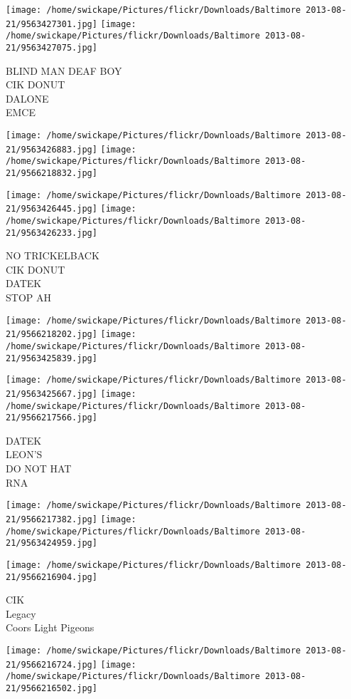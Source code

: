 \documentclass[10pt,letterpaper]{article}
\begin{document}
\texttt{[image: /home/swickape/Pictures/flickr/Downloads/Baltimore 2013-08-21/9563427301.jpg]}
\texttt{[image: /home/swickape/Pictures/flickr/Downloads/Baltimore 2013-08-21/9563427075.jpg]}

BLIND MAN DEAF BOY\\
CIK DONUT\\
DALONE\\
EMCE
\pagebreak

\texttt{[image: /home/swickape/Pictures/flickr/Downloads/Baltimore 2013-08-21/9563426883.jpg]}
\texttt{[image: /home/swickape/Pictures/flickr/Downloads/Baltimore 2013-08-21/9566218832.jpg]}

\texttt{[image: /home/swickape/Pictures/flickr/Downloads/Baltimore 2013-08-21/9563426445.jpg]}
\texttt{[image: /home/swickape/Pictures/flickr/Downloads/Baltimore 2013-08-21/9563426233.jpg]}

NO TRICKELBACK\\
CIK DONUT\\
DATEK\\
STOP AH
\pagebreak

\texttt{[image: /home/swickape/Pictures/flickr/Downloads/Baltimore 2013-08-21/9566218202.jpg]}
\texttt{[image: /home/swickape/Pictures/flickr/Downloads/Baltimore 2013-08-21/9563425839.jpg]}

\texttt{[image: /home/swickape/Pictures/flickr/Downloads/Baltimore 2013-08-21/9563425667.jpg]}
\texttt{[image: /home/swickape/Pictures/flickr/Downloads/Baltimore 2013-08-21/9566217566.jpg]}

DATEK\\
LEON'S\\
DO NOT HAT\\
RNA
\pagebreak

\texttt{[image: /home/swickape/Pictures/flickr/Downloads/Baltimore 2013-08-21/9566217382.jpg]}
\texttt{[image: /home/swickape/Pictures/flickr/Downloads/Baltimore 2013-08-21/9563424959.jpg]}

\vspace{0.25in}
\texttt{[image: /home/swickape/Pictures/flickr/Downloads/Baltimore 2013-08-21/9566216904.jpg]}

CIK\\
Legacy\\
Coors Light Pigeons
\pagebreak

\texttt{[image: /home/swickape/Pictures/flickr/Downloads/Baltimore 2013-08-21/9566216724.jpg]}
\texttt{[image: /home/swickape/Pictures/flickr/Downloads/Baltimore 2013-08-21/9566216502.jpg]}
\end{document}
